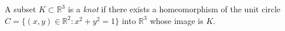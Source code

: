 A subset $K \subset \mathbb{R}^3$ is a \textit{knot} if there exists a homeomorphism of the unit circle $C = \{(x,y) \in \mathbb{R}^2 : x^2 + y^2 = 1\}$ into $\mathbb{R}^3$ whose image is $K$.
